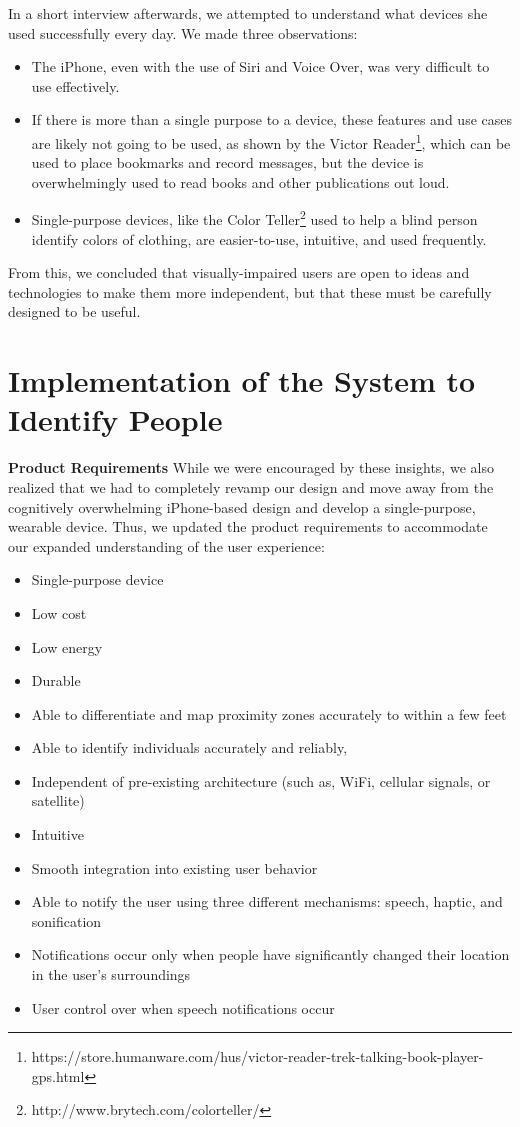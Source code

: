 In a short interview afterwards, we attempted to understand what devices she used successfully every day. We made three observations: 
\begin{itemize}
\item The iPhone, even with the use of Siri and Voice Over, was very difficult to use effectively.
\item If there is more than a single purpose to a device, these features and use cases are likely not going to be used, as shown by the Victor Reader\footnote{https://store.humanware.com/hus/victor-reader-trek-talking-book-player-gps.html}, which can be used to place bookmarks and record messages, but the device is overwhelmingly used to read books and other publications out loud.
\item Single-purpose devices, like the Color Teller\footnote{http://www.brytech.com/colorteller/} used to help a blind person identify colors of clothing, are easier-to-use, intuitive, and used frequently.
\end{itemize}

From this, we concluded that visually-impaired users are open to ideas and technologies to make them more independent, but that these must be carefully designed to be useful.

\section{Implementation of the System to Identify People}
\label{sect:wearable}
\textbf{Product Requirements}
\newline
While we were encouraged by these insights, we also realized that we had to completely revamp our design and move away from the cognitively overwhelming iPhone-based design and develop a single-purpose, wearable device.  Thus, we updated the product requirements to accommodate our expanded understanding of the user experience: 
\begin{itemize}
\item Single-purpose device
\item Low cost 
\item Low energy 
\item Durable 
\item Able to differentiate and map proximity zones accurately to within a few feet
\item Able to identify individuals accurately and reliably,
\item Independent of pre-existing architecture (such as, WiFi, cellular signals, or satellite)
\item Intuitive
\item Smooth integration into existing user behavior
\item Able to notify the user using three different mechanisms: speech, haptic, and sonification
\item Notifications occur only when people have significantly changed their location in the user's surroundings
\item User control over when speech notifications occur
\end{itemize}

